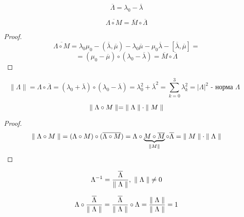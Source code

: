   \lline
  \begin{df}
  \[ \overline{\Lambda} = \lambda_0 - \overline{\lambda} \]
  \end{df}
  \begin{ass}
  \[ \overline{\Lambda \circ M} = \overline{M} \circ \overline{\Lambda} \]
  \end{ass}
  \begin{proof}
  \[ \overline{\Lambda \circ M} = \lambda_0\mu_0 - (\overline\lambda, \overline\mu) - \lambda_0\overline\mu - \mu_0\overline\lambda - [\overline\lambda, \overline\mu] = \]
  \[ = (\mu_0 - \overline\mu) \circ (\lambda_0 - \overline\lambda) = \overline M \circ \overline \Lambda \]
  \end{proof}
  \begin{df}
  \[ \parallel \Lambda \parallel = \Lambda \circ \overline \Lambda = (\lambda_0 + \overline \lambda) \circ (\lambda_0 - \overline \lambda) = \lambda_0^2 + \overline \lambda^2 = \sum\limits_{k = 0}^3 \lambda_k^2 = | \Lambda |^2 \text{ - норма $\Lambda$ }\]
  \end{df}
  \begin{ass}
  \[ \parallel \Lambda \circ M \parallel = {\parallel \Lambda \parallel} \cdot {\parallel M \parallel} \]
  \end{ass}
  \begin{proof}
  \[ {\parallel \Lambda \circ M \parallel} = (\Lambda \circ M) \circ (\overline{\Lambda \circ M}) = \Lambda \circ \underbrace{M \circ \overline M}_{{\parallel M \parallel}}  \circ \overline \Lambda = {\parallel M \parallel} \cdot {\parallel \Lambda \parallel} \]
  \end{proof}
  \begin{df}
  \[ \Lambda^{-1} = \frac{\overline \Lambda}{{\parallel \Lambda \parallel}},~ {\parallel \Lambda \parallel} \neq 0 \]
  \end{df}
  \begin{ntc}
  \[ \Lambda \circ \frac{\overline{\Lambda}}{{\parallel \Lambda \parallel}} = \frac{\overline \Lambda}{{\parallel \Lambda \parallel}} \circ \Lambda = \frac{{\parallel \Lambda \parallel}}{{\parallel \Lambda \parallel}} = 1 \]
  \end{ntc}

